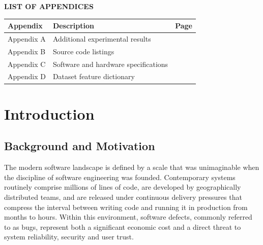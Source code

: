 \documentclass[12pt,a4paper,oneside]{report}
\newcommand{\tabfont}{\fontsize{11}{13}\selectfont\setlength{\tabcolsep}{4pt}}
\newcommand{\frontheading}[1]{%
  \clearpage
  \begin{center}
    {\fontsize{14}{18}\bfseries\MakeUppercase{#1}}
  \end{center}
  \vspace{10pt}
}
\begin{document}
\clearpage

\frontheading{List of Appendices}

\begin{center}
\tabfont
\begin{tabular}{L{32mm}L{75mm}C{18mm}}
\toprule
\textbf{Appendix} & \textbf{Description} & \textbf{Page} \\
\midrule
Appendix A & Additional experimental results & \pageref{app:a} \\
Appendix B & Source code listings & \pageref{app:b} \\
Appendix C & Software and hardware specifications & \pageref{app:c} \\
Appendix D & Dataset feature dictionary & \pageref{app:d} \\
\bottomrule
\end{tabular}
\end{center}

\clearpage

\setcounter{page}{1}

\chapter{Introduction}

\section{Background and Motivation}

The modern software landscape is defined by a scale that was unimaginable when the discipline of software engineering was founded. Contemporary systems routinely comprise millions of lines of code, are developed by geographically distributed teams, and are released under continuous delivery pressures that compress the interval between writing code and running it in production from months to hours. Within this environment, software defects, commonly referred to as bugs, represent both a significant economic cost and a direct threat to system reliability, security and user trust.
\end{document}
